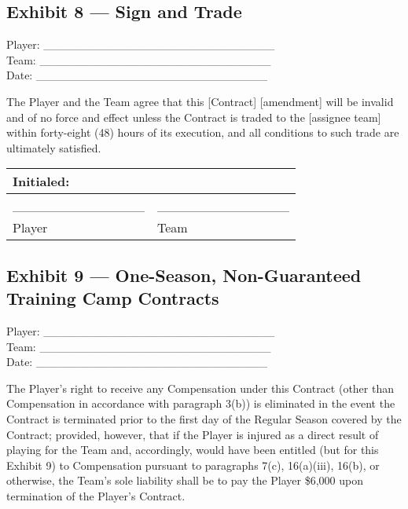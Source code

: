\documentclass[
]{book}
\begin{document}
\newpage

\hypertarget{exhibit-8-sign-and-trade}{%
\subsection{Exhibit 8 --- Sign and Trade}\label{exhibit-8-sign-and-trade}}

Player: \_\_\_\_\_\_\_\_\_\_\_\_\_\_\_\_\_\_\_\_\_\_\_\_\_\_\_\_\\
Team: \_\_\_\_\_\_\_\_\_\_\_\_\_\_\_\_\_\_\_\_\_\_\_\_\_\_\_\_\\
Date: \_\_\_\_\_\_\_\_\_\_\_\_\_\_\_\_\_\_\_\_\_\_\_\_\_\_\_\_

The Player and the Team agree that this {[}Contract{]} {[}amendment{]} will be invalid and of no force and effect unless the Contract is traded to the {[}assignee team{]} within forty-eight (48) hours of its execution, and all conditions to such trade are ultimately satisfied.

\begin{longtable}[]{@{}ll@{}}
\toprule()
Initialed: & \\
\midrule()
\endhead
\_\_\_\_\_\_\_\_\_\_\_\_\_\_ & \_\_\_\_\_\_\_\_\_\_\_\_\_\_ \\
Player & Team \\
\bottomrule()
\end{longtable}

\newpage

\hypertarget{exhibit-9-one-season-non-guaranteed-training-camp-contracts}{%
\subsection{Exhibit 9 --- One-Season, Non-Guaranteed Training Camp Contracts}\label{exhibit-9-one-season-non-guaranteed-training-camp-contracts}}

Player: \_\_\_\_\_\_\_\_\_\_\_\_\_\_\_\_\_\_\_\_\_\_\_\_\_\_\_\_\\
Team: \_\_\_\_\_\_\_\_\_\_\_\_\_\_\_\_\_\_\_\_\_\_\_\_\_\_\_\_\\
Date: \_\_\_\_\_\_\_\_\_\_\_\_\_\_\_\_\_\_\_\_\_\_\_\_\_\_\_\_

The Player's right to receive any Compensation under this Contract (other than Compensation in accordance with paragraph 3(b)) is eliminated in the event the Contract is terminated prior to the first day of the Regular Season covered by the Contract; provided, however, that if the Player is injured as a direct result of playing for the Team and, accordingly, would have been entitled (but for this Exhibit 9) to Compensation pursuant to paragraphs 7(c), 16(a)(iii), 16(b), or otherwise, the Team's sole liability shall be to pay the Player \$6,000 upon termination of the Player's Contract.
\end{document}
